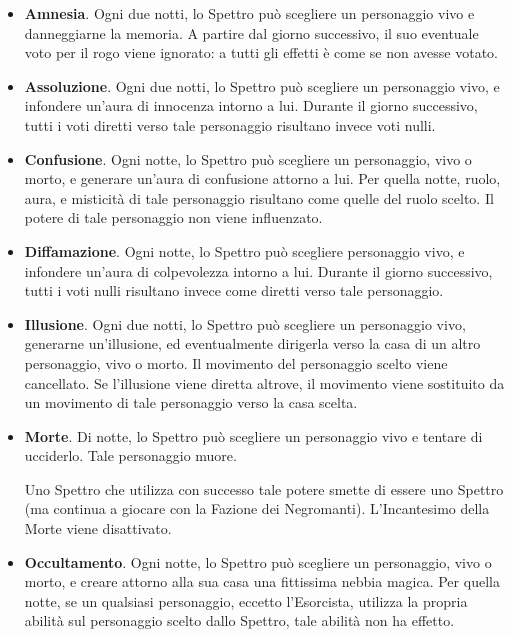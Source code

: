 \documentclass[a4paper,10pt]{article}
\begin{document}
\begin{itemize}

	\item {\bf Amnesia}. Ogni due notti, lo Spettro può scegliere un personaggio vivo e danneggiarne la memoria. A partire dal giorno successivo, il suo eventuale voto per il rogo viene ignorato: a tutti gli effetti è come se non avesse votato.
 
	\item {\bf Assoluzione}. Ogni due notti, lo Spettro può scegliere un personaggio vivo, e infondere un'aura di innocenza intorno a lui. Durante il giorno successivo, tutti i voti diretti verso tale personaggio risultano invece voti nulli.
	
	\item {\bf Confusione}. Ogni notte, lo Spettro può scegliere un personaggio, vivo o morto, e generare un'aura di confusione attorno a lui. Per quella notte, ruolo, aura, e misticità di tale personaggio risultano come quelle del ruolo scelto. Il potere di tale personaggio non viene influenzato.

	\item {\bf Diffamazione}. Ogni notte, lo Spettro può scegliere personaggio vivo, e infondere un'aura di colpevolezza intorno a lui. Durante il giorno successivo, tutti i voti nulli risultano invece come diretti verso tale personaggio.
	
	\item {\bf Illusione}. Ogni due notti, lo Spettro può scegliere un personaggio vivo, generarne un'illusione, ed eventualmente dirigerla verso la casa di un altro personaggio, vivo o morto. Il movimento del personaggio scelto viene cancellato. Se l'illusione viene diretta altrove, il movimento viene sostituito da un movimento di tale personaggio verso la casa scelta.
	
	\item {\bf Morte}. Di notte, lo Spettro può scegliere un personaggio vivo e tentare di ucciderlo. Tale personaggio muore.
	
	Uno Spettro che utilizza con successo tale potere smette di essere uno Spettro (ma continua a giocare con la Fazione dei Negromanti). L'Incantesimo della Morte viene disattivato.
 
	\item {\bf Occultamento}. Ogni notte, lo Spettro può scegliere un personaggio, vivo o morto, e creare attorno alla sua casa una fittissima nebbia magica. Per quella notte, se un qualsiasi personaggio, eccetto l'Esorcista, utilizza la propria abilità sul personaggio scelto dallo Spettro, tale abilità non ha effetto.
	

\end{itemize}
\end{document}

